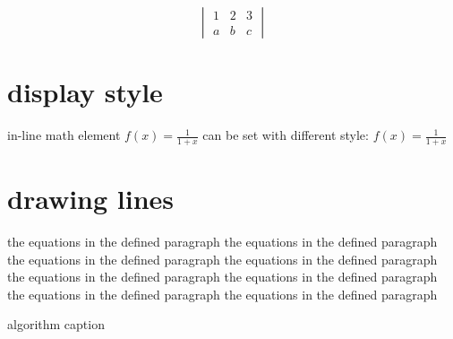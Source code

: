 \documentclass[12pt]{book}
\begin{document}
$$
\begin{vmatrix}
1 & 2 & 3\\
a & b & c
\end{vmatrix}
$$
\section{display style}
in-line math element $f(x) = \frac{1}{1+x}$ can be set with different style: $f(x) =  \displaystyle \frac{1}{1+x}$

\section{drawing lines} 


\vspace{3cm}




\begin{multicols}{2}
the equations in the defined paragraph the equations in the defined paragraph the equations in the defined paragraph the equations in the defined paragraph the equations in the defined paragraph the equations in the defined paragraph the equations in the defined paragraph the equations in the defined paragraph
\end{multicols}

\begin{algorithm}
\caption{algorithm caption}

\end{algorithm}
\end{document}
